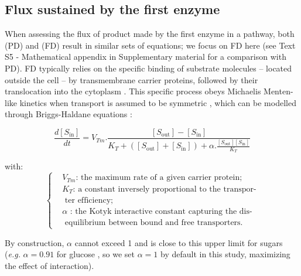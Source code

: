 \documentclass[nogrid,crop,final]{MBE2}%
\begin{document}
\subsection{Flux sustained by the first enzyme}

When assessing the flux of product made by the first enzyme in a pathway, both (PD) and (FD) result in similar sets of equations; we focus on FD here (see Text S5 - Mathematical appendix in Supplementary material for a comparison with PD). FD typically relies on the specific binding of substrate molecules -- located outside the cell -- by transmembrane carrier proteins, followed by their translocation into the cytoplasm \citep{danielli1954,Wilbrandt61,Kotyk67,Bosdriesz18}. This specific process obeys Michaelis Menten-like kinetics when transport is assumed to be symmetric \citep{Kotyk67}, which can be modelled through Briggs-Haldane equations \citep{Briggs25,Haldane30,Stein86d}:

\small
\begin{equation}
\frac{d[S_\text{in}]}{dt}=V_{Tm}.\frac{[S_\text{out}]-[S_\text{in}]}{K_T+([S_\text{out}]+[S_\text{in}])+\alpha.\frac{[S_\text{out}][S_\text{in}]}{K_T}}
\end{equation}
\normalsize

with:
\small
\begin{equation*}
  \left\{
      \begin{aligned}
		&V_{Tm}\text{: the maximum rate of a given carrier protein;}\\
		&K_T\text{: a constant inversely proportional to the transpor-}\\
		&\text{  ter efficiency};\\
		&\alpha \text{ : the Kotyk interactive constant  capturing the dis-}\\
		&\text{  equilibrium between bound and free transporters.}
      \end{aligned}
    \right.
\end{equation*}
\normalsize

By construction, $\alpha$ cannot exceed 1 \cite{Kotyk67} and is close to this upper limit for sugars (\textit{e.g.} $\alpha=0.91$ for glucose \citep{Teusink98}, so we set $\alpha=1$ by default in this study, maximizing the effect of interaction).
\end{document}
